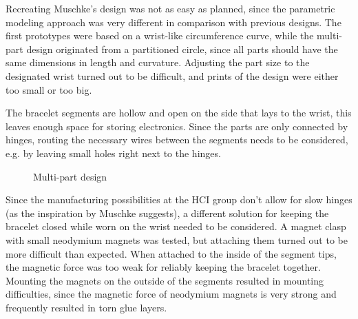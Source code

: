 Recreating Muschke's design was not as easy as planned, since the parametric modeling approach was very different in comparison with previous designs. The first prototypes were based on a wrist-like circumference curve, while the multi-part design originated from a partitioned circle, since all parts should have the same dimensions in length and curvature. Adjusting the part size to the designated wrist turned out to be difficult, and prints of the design were either too small or too big.

The bracelet segments are hollow and open on the side that lays to the wrist, this leaves enough space for storing electronics. Since the parts are only connected by hinges, routing the necessary wires between the segments needs to be considered, e.g. by leaving small holes right next to the hinges.

\begin{figure}[bth]
	\myfloatalign
	 \quad
	\caption{Multi-part design}
\end{figure}

Since the manufacturing possibilities at the \ac{HCI} group don't allow for slow hinges (as the inspiration by Muschke suggests), a different solution for keeping the bracelet closed while worn on the wrist needed to be considered. A magnet clasp with small neodymium magnets was tested, but attaching them turned out to be more difficult than expected. When attached to the inside of the segment tips, the magnetic force was too weak for reliably keeping the bracelet together. Mounting the magnets on the outside of the segments resulted in mounting difficulties, since the magnetic force of neodymium magnets is very strong and frequently resulted in torn glue layers.

